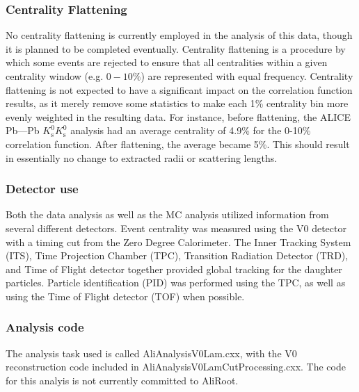 \subsubsection{Centrality Flattening}
\label{sec:CentralityFlattening}

No centrality flattening is currently employed in the analysis of this data, though it is planned to be completed eventually.  
Centrality flattening is a procedure by which some events are rejected to ensure that all centralities within a given centrality window (e.g. $0-10\%$) are represented with equal frequency.  
Centrality flattening is not expected to have a significant impact on the correlation function results, as it merely remove some statistics to make each 1\% centrality bin more evenly weighted in the resulting data.  
For instance, before flattening, the ALICE Pb---Pb $K^0_\mathrm{s}K^0_\mathrm{s}$ analysis had an average centrality of 4.9\% for the 0-10\% correlation function.  
After flattening, the average became 5\%.  
This should result in essentially no change to extracted radii or scattering lengths.

\subsubsection{Detector use}
Both the data analysis as well as the MC analysis utilized information from several different detectors.  
Event centrality was measured using the V0 detector with a timing cut from the Zero Degree Calorimeter.  
The Inner Tracking System (ITS), Time Projection Chamber (TPC), Transition Radiation Detector (TRD), and Time of Flight detector together provided global tracking for the daughter particles.  
Particle identification (PID) was performed using the TPC, as well as using the Time of Flight detector (TOF) when possible.

\subsubsection{Analysis code}
The analysis task used is called AliAnalysisV0Lam.cxx, with the V0 reconstruction code included in AliAnalysisV0LamCutProcessing.cxx.  
The code for this analyis is not currently committed to AliRoot.